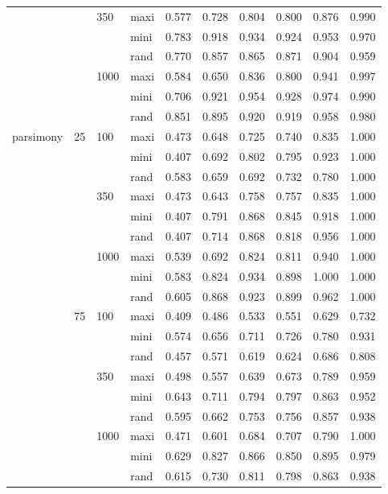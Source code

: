 \begin{longtable}{llllrrrrrr}
   &  & 350 & maxi & 0.577 & 0.728 & 0.804 & 0.800 & 0.876 & 0.990 \\ 
   &  &  & mini & 0.783 & 0.918 & 0.934 & 0.924 & 0.953 & 0.970 \\ 
   &  &  & rand & 0.770 & 0.857 & 0.865 & 0.871 & 0.904 & 0.959 \\ 
   &  & 1000 & maxi & 0.584 & 0.650 & 0.836 & 0.800 & 0.941 & 0.997 \\ 
   &  &  & mini & 0.706 & 0.921 & 0.954 & 0.928 & 0.974 & 0.990 \\ 
   &  &  & rand & 0.851 & 0.895 & 0.920 & 0.919 & 0.958 & 0.980 \\ 
  parsimony & 25 & 100 & maxi & 0.473 & 0.648 & 0.725 & 0.740 & 0.835 & 1.000 \\ 
   &  &  & mini & 0.407 & 0.692 & 0.802 & 0.795 & 0.923 & 1.000 \\ 
   &  &  & rand & 0.583 & 0.659 & 0.692 & 0.732 & 0.780 & 1.000 \\ 
   &  & 350 & maxi & 0.473 & 0.643 & 0.758 & 0.757 & 0.835 & 1.000 \\ 
   &  &  & mini & 0.407 & 0.791 & 0.868 & 0.845 & 0.918 & 1.000 \\ 
   &  &  & rand & 0.407 & 0.714 & 0.868 & 0.818 & 0.956 & 1.000 \\ 
   &  & 1000 & maxi & 0.539 & 0.692 & 0.824 & 0.811 & 0.940 & 1.000 \\ 
   &  &  & mini & 0.583 & 0.824 & 0.934 & 0.898 & 1.000 & 1.000 \\ 
   &  &  & rand & 0.605 & 0.868 & 0.923 & 0.899 & 0.962 & 1.000 \\ 
   & 75 & 100 & maxi & 0.409 & 0.486 & 0.533 & 0.551 & 0.629 & 0.732 \\ 
   &  &  & mini & 0.574 & 0.656 & 0.711 & 0.726 & 0.780 & 0.931 \\ 
   &  &  & rand & 0.457 & 0.571 & 0.619 & 0.624 & 0.686 & 0.808 \\ 
   &  & 350 & maxi & 0.498 & 0.557 & 0.639 & 0.673 & 0.789 & 0.959 \\ 
   &  &  & mini & 0.643 & 0.711 & 0.794 & 0.797 & 0.863 & 0.952 \\ 
   &  &  & rand & 0.595 & 0.662 & 0.753 & 0.756 & 0.857 & 0.938 \\ 
   &  & 1000 & maxi & 0.471 & 0.601 & 0.684 & 0.707 & 0.790 & 1.000 \\ 
   &  &  & mini & 0.629 & 0.827 & 0.866 & 0.850 & 0.895 & 0.979 \\ 
   &  &  & rand & 0.615 & 0.730 & 0.811 & 0.798 & 0.863 & 0.938 \\ 

\end{longtable}
